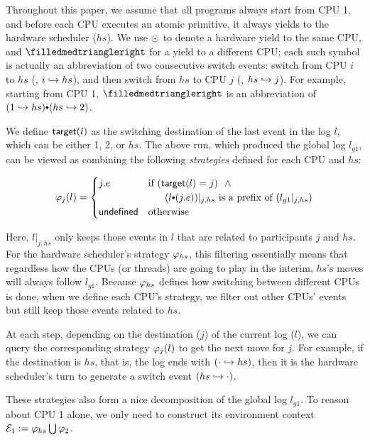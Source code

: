 Throughout this paper, we assume that all programs always
start from CPU 1, and before each CPU executes an atomic primitive,
it always yields to the hardware scheduler ($hs$).
We use $\odot$ to denote a hardware yield to the same CPU,
and $\sdiff$ for a yield to a different CPU; each such symbol
is actually an abbreviation of two consecutive switch events: switch
from CPU $i$ to $hs$ (\ie, $i\hookrightarrow{}hs$), and then switch from $hs$
to CPU $j$ (\ie, $hs \hookrightarrow j$).  For example, starting from CPU 1,
$\sdiff$ is an abbreviation of $(1\switch{}hs) \cons (hs\switch 2)$.

We define $\mathsf{target}(l)$ as the switching destination of the last event in
the log $l$, which can be either 1, 2, or $hs$. The above run,
which produced the global log $l_{g1}$, can be viewed as combining
the following {\em strategies} defined for each CPU and $hs$:

\vspace*{-1ex}
\begin{small}
\[
\strat{j} (l)=
\begin{cases}
  j.e & \text{if } (\comm{target}(l) = j) ~~\wedge \\
      & ~~~~~(l\cons (j.e)) |_{j,hs} \text{ is a prefix of } (l_{g1} |_{j,hs}) \\
\comm{undefined } & \text{otherwise}
\end{cases}
\]
\end{small}%

\noindent{}Here, $l |_{j,hs}$ only keeps those events in $l$ that are
related to participants $j$ and $hs$.  For the hardware scheduler's
strategy $\varphi_{hs}$, this filtering essentially means that
regardless how the CPUs (or threads) are going to play in the interim,
$hs$'s moves will always follow $l_{g1}$.  Because $\varphi_{hs}$
defines how switching between different CPUs is done, when we define
each CPU's strategy, we filter out other CPUs' events but still keep
those events related to $hs$.

At each step, depending on the destination ($j$) of the current log
($l$), we can query the corresponding strategy $\varphi_{j}(l)$ to get the
next move for $j$.  For example, if the destination is $hs$, that is,
the log ends with $(\cdot\hookrightarrow hs)$, then it is the
hardware scheduler's turn to generate a switch event $(hs\hookrightarrow \cdot)$.

These strategies also form a nice decomposition of the global log
$l_{g1}$. To reason about CPU 1 alone, we only need to construct
its environment context $\mathcal{E}_1 := \varphi_{hs} \bigcup \varphi_{2}$.

